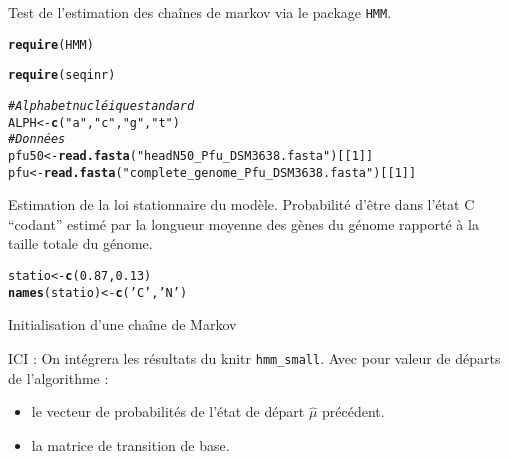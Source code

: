 \documentclass{article}
\makeatletter
\newcommand{\hlnum}[1]{\textcolor[rgb]{0.686,0.059,0.569}{#1}}%
\newcommand{\hlstr}[1]{\textcolor[rgb]{0.192,0.494,0.8}{#1}}%
\newcommand{\hlcom}[1]{\textcolor[rgb]{0.678,0.584,0.686}{\textit{#1}}}%
\newcommand{\hlstd}[1]{\textcolor[rgb]{0.345,0.345,0.345}{#1}}%
\newcommand{\hlkwb}[1]{\textcolor[rgb]{0.69,0.353,0.396}{#1}}%
\newcommand{\hlkwd}[1]{\textcolor[rgb]{0.737,0.353,0.396}{\textbf{#1}}}%
\newenvironment{kframe}{%
 \def\at@end@of@kframe{}%
 \ifinner\ifhmode%
  \def\at@end@of@kframe{\end{minipage}}%
  \begin{minipage}{\columnwidth}%
 \fi\fi%
 \def\FrameCommand##1{\hskip\@totalleftmargin \hskip-\fboxsep
 \colorbox{shadecolor}{##1}\hskip-\fboxsep
     \hskip-\linewidth \hskip-\@totalleftmargin \hskip\columnwidth}%
 \MakeFramed {\advance\hsize-\width
   \@totalleftmargin\z@ \linewidth\hsize
   \@setminipage}}%
 {\par\unskip\endMakeFramed%
 \at@end@of@kframe}
\newenvironment{knitrout}{}{} %
\makeatother
\begin{document}
Test de l'estimation des chaînes de markov via 
le package \verb+HMM+.

\begin{knitrout}
\color{fgcolor}\begin{kframe}
\begin{alltt}
\hlkwd{require}\hlstd{(HMM)}
\end{alltt}


{\ttfamily\noindent\itshape\color{messagecolor}{\#\# Loading required package: HMM}}\begin{alltt}
\hlkwd{require}\hlstd{(seqinr)}
\end{alltt}


{\ttfamily\noindent\itshape\color{messagecolor}{\#\# Loading required package: seqinr\\\#\# Loading required package: ade4}}\begin{alltt}
\hlcom{# Alphabet nucléique standard}
\hlstd{ALPH}\hlkwb{<-}\hlkwd{c}\hlstd{(}\hlstr{"a"}\hlstd{,} \hlstr{"c"}\hlstd{,} \hlstr{"g"}\hlstd{,} \hlstr{"t"}\hlstd{)}
\hlcom{# Données}
\hlstd{pfu50}\hlkwb{<-}\hlkwd{read.fasta}\hlstd{(}\hlstr{"headN50_Pfu_DSM3638.fasta"}\hlstd{)[[}\hlnum{1}\hlstd{]]}
\hlstd{pfu}\hlkwb{<-}\hlkwd{read.fasta}\hlstd{(}\hlstr{"complete_genome_Pfu_DSM3638.fasta"}\hlstd{)[[}\hlnum{1}\hlstd{]]}
\end{alltt}
\end{kframe}
\end{knitrout}

Estimation de la  loi stationnaire du modèle.
Probabilité d'être dans l'état C ``codant'' estimé par
la longueur moyenne des gènes du génome rapporté à la taille totale du génome.

\begin{knitrout}
\color{fgcolor}\begin{kframe}
\begin{alltt}
\hlstd{statio}\hlkwb{<-}\hlkwd{c}\hlstd{(}\hlnum{0.87}\hlstd{,} \hlnum{0.13}\hlstd{)}
\hlkwd{names}\hlstd{(statio)}\hlkwb{<-}\hlkwd{c}\hlstd{(}\hlstr{'C'}\hlstd{,}\hlstr{'N'}\hlstd{)}
\end{alltt}
\end{kframe}
\end{knitrout}

Initialisation d'une chaîne de Markov

ICI : On intégrera les résultats du knitr \texttt{hmm\_small}. Avec  pour valeur de départs de l'algorithme : 
\begin{itemize}
\item le vecteur de probabilités de l'état de départ $\hat{\mu}$ précédent.
\item la matrice de transition de base.
\end{itemize}
\end{document}
